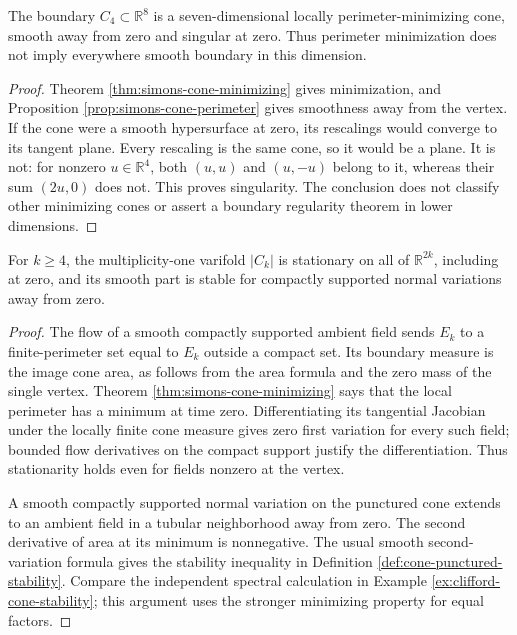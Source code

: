 \begin{corollary}\label{cor:simons-eight-dimensional-example}
The boundary $C_4\subset\mathbb R^8$ is a seven-dimensional locally perimeter-minimizing cone, smooth away from zero and singular at zero. Thus perimeter minimization does not imply everywhere smooth boundary in this dimension.
\end{corollary}
\begin{proof}
Theorem \ref{thm:simons-cone-minimizing} gives minimization, and Proposition \ref{prop:simons-cone-perimeter} gives smoothness away from the vertex. If the cone were a smooth hypersurface at zero, its rescalings would converge to its tangent plane. Every rescaling is the same cone, so it would be a plane. It is not: for nonzero $u\in\mathbb R^4$, both $(u,u)$ and $(u,-u)$ belong to it, whereas their sum $(2u,0)$ does not. This proves singularity. The conclusion does not classify other minimizing cones or assert a boundary regularity theorem in lower dimensions.
\end{proof}

\begin{corollary}\label{cor:simons-minimizer-stationary}
For $k\geq4$, the multiplicity-one varifold $|C_k|$ is stationary on all of $\mathbb R^{2k}$, including at zero, and its smooth part is stable for compactly supported normal variations away from zero.
\end{corollary}
\begin{proof}
The flow of a smooth compactly supported ambient field sends $E_k$ to a finite-perimeter set equal to $E_k$ outside a compact set. Its boundary measure is the image cone area, as follows from the area formula and the zero mass of the single vertex. Theorem \ref{thm:simons-cone-minimizing} says that the local perimeter has a minimum at time zero. Differentiating its tangential Jacobian under the locally finite cone measure gives zero first variation for every such field; bounded flow derivatives on the compact support justify the differentiation. Thus stationarity holds even for fields nonzero at the vertex.

A smooth compactly supported normal variation on the punctured cone extends to an ambient field in a tubular neighborhood away from zero. The second derivative of area at its minimum is nonnegative. The usual smooth second-variation formula gives the stability inequality in Definition \ref{def:cone-punctured-stability}. Compare the independent spectral calculation in Example \ref{ex:clifford-cone-stability}; this argument uses the stronger minimizing property for equal factors.
\end{proof}
